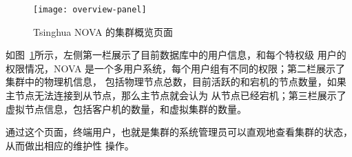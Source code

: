\begin{figure}[h]
    \centering
    \texttt{[image: overview-panel]}
    \caption{Tsinghua NOVA 的集群概览页面}
    \label{fig:overview-panel}
\end{figure}

如图~\ref{fig:overview-panel}所示，左侧第一栏展示了目前数据库中的用户信息，和每个特权级
用户的权限情况，NOVA 是一个多用户系统，每个用户组有不同的权限；第二栏展示了集群中的物理机信息，
包括物理节点总数，目前活跃的和宕机的节点数量，如果主节点无法连接到从节点，那么主节点就会认为
从节点已经宕机；第三栏展示了虚拟节点信息，包括客户机的数量，和虚拟集群的数量。

通过这个页面，终端用户，也就是集群的系统管理员可以直观地查看集群的状态，从而做出相应的维护性
操作。
